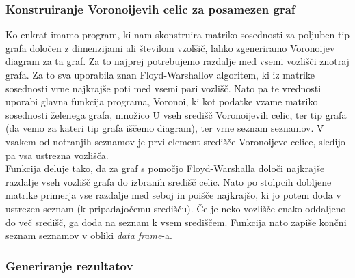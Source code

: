 \documentclass[
]{article}
\begin{document}
\hypertarget{konstruiranje-voronoijevih-celic-za-posamezen-graf}{%
\subsubsection{Konstruiranje Voronoijevih celic za posamezen
graf}\label{konstruiranje-voronoijevih-celic-za-posamezen-graf}}

Ko enkrat imamo program, ki nam skonstruira matriko sosednosti za
poljuben tip grafa določen z dimenzijami ali številom vzolšič, lahko
zgeneriramo Voronoijev diagram za ta graf. Za to najprej potrebujemo
razdalje med vsemi vozlišči znotraj grafa. Za to sva uporabila znan
Floyd-Warshallov algoritem, ki iz matrike sosednosti vrne najkrajše poti
med vsemi pari vozlišč. Nato pa te vrednosti uporabi glavna funkcija
programa, Voronoi, ki kot podatke vzame matriko sosednosti želenega
grafa, množico U vseh središč Voronoijevih celic, ter tip grafa (da vemo
za kateri tip grafa iščemo diagram), ter vrne seznam seznamov. V vsakem
od notranjih seznamov je prvi element središče Voronoijeve celice,
sledijo pa vsa ustrezna vozlišča.\\
Funkcija deluje tako, da za graf s pomočjo Floyd-Warshalla določi
najkrajše razdalje vseh vozlišč grafa do izbranih središč celic. Nato po
stolpcih dobljene matrike primerja vse razdalje med seboj in poišče
najkrajšo, ki jo potem doda v ustrezen seznam (k pripadajočemu
središču). Če je neko vozlišče enako oddaljeno do več središč, ga doda
na seznam k vsem središčem. Funkcija nato zapiše končni seznam seznamov
v obliki \emph{data frame}-a.

\hypertarget{generiranje-rezultatov}{%
\subsubsection{Generiranje rezultatov}\label{generiranje-rezultatov}}
\end{document}
